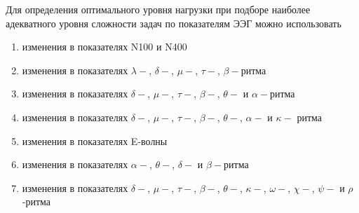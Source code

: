 
Для определения оптимального уровня нагрузки при подборе наиболее адекватного уровня сложности задач по показателям ЭЭГ можно использовать  

\begin{enumerate}
    \item изменения в показателях N100 и N400
    \item изменения в показателях $\lambda-$,  $\delta-$, $\mu-$, $\tau-$,  $\beta-$ритма
    \item изменения в показателях  $\delta-$, $\mu-$,  $\tau-$,  $\beta-$,  $\theta-$ и $\alpha-$ритма
    \item изменения в показателях  $\delta-$, $\mu-$,  $\tau-$, $\beta-$,  $\theta-$, $\alpha-$ и  $\kappa-$ ритма
    \item изменения в показателях E-волны
    \item изменения в показателях  $\alpha-$,  $\theta-$,  $\delta-$ и $\beta-$ритма
    \item изменения в показателях  $\delta-$, $\mu-$, $\tau-$,  $\beta-$,  $\theta-$,  $\kappa-$,  $\omega-$,  $\chi-$,  $\psi-$ и  $\rho$-ритма
\end{enumerate}

